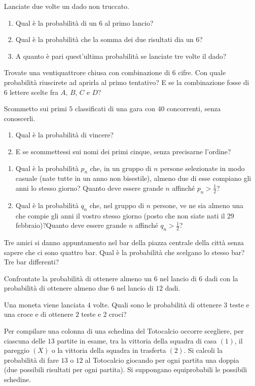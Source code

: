 Lanciate due volte un dado non truccato.
\begin{enumerate}
\item Qual è la probabilità di un $6$ al primo lancio?
\item Qual è la probabilità che la somma dei due risultati dia un $6$?
\item A quanto è pari quest'ultima probabilità se lanciate tre volte il dado?
\end{enumerate}
\Esercizio{}

Trovate una ventiquattrore chiusa con combinazione di $6$ cifre. Con quale probabilità riuscirete ad aprirla al primo tentativo? E se la combinazione fosse di $6$ lettere scelte fra $A$, $B$, $C$ e $D$?
\Esercizio{}

Scommetto sui primi $5$ classificati di una gara con $40$ concorrenti, senza conoscerli.
\begin{enumerate}
\item Qual è la probabilità di vincere?
\item E se scommettessi sui nomi dei primi cinque, senza precisarne l'ordine?
\end{enumerate}
\begin{enumerate}
\item Qual è la probabilità $p_{n}$ che, in un gruppo di $n$ persone selezionate in modo casuale (nate tutte in un anno non bisestile), almeno due di esse compiano gli anni lo stesso giorno? Quanto deve essere grande $n$ affinché $p_{n}  >\frac{1}{2}$?
\item Qual è la probabilità $q_{n}$ che, nel gruppo di $n$ persone, ve ne sia almeno una che compie gli anni il vostro stesso giorno (posto che non siate nati il 29 febbraio)?Quanto deve essere grande $n$ affinché $q_{n}  >\frac{1}{2}$?
\end{enumerate}
\Esercizio{}

Tre amici si danno appuntamento nel bar della piazza centrale della città senza sapere che ci sono quattro bar. Qual è la probabilità che scelgano lo stesso bar? Tre bar differenti?
\Esercizio{}

Confrontate la probabilità di ottenere almeno un $6$ nel lancio di $6$ dadi con la probabilità di ottenere almeno due $6$ nel lancio di $12$ dadi.
\Esercizio{}

Una moneta viene lanciata $4$ volte. Quali sono le probabilità di ottenere $3$ teste e una croce e di ottenere $2$ teste e $2$ croci?
\Esercizio{}

Per compilare una colonna di una schedina del Totocalcio occorre scegliere, per ciascuna delle $13$ partite in esame, tra la vittoria della squadra di casa $( 1)$, il pareggio $( X)$ o la vittoria della squadra in trasferta $( 2)$. Si calcoli la probabilità di fare $13$ o $12$ al Totocalcio giocando per ogni partita una doppia (due possibili risultati per ogni partita). Si suppongano equiprobabili le possibili schedine.
\Esercizio{}

